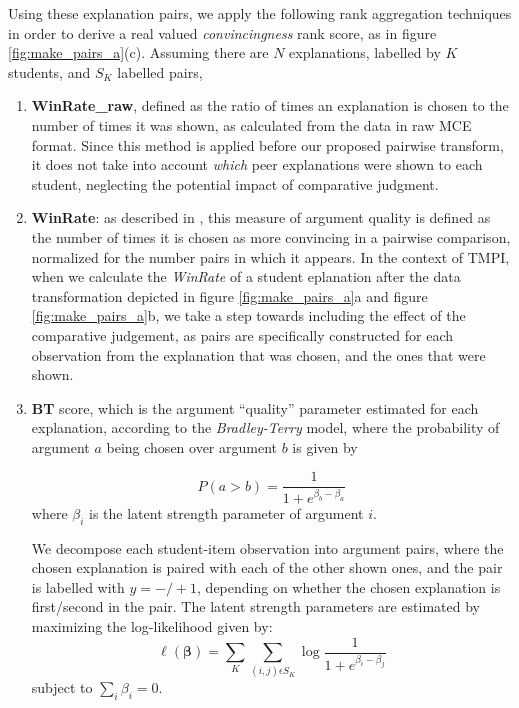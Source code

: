 \documentclass[notitlepage,12pt]{jedm}
\begin{document}
Using these explanation pairs, we apply the following rank aggregation 
techniques in order to derive a real valued \textit{convincingness} rank score, 
as in figure \ref{fig:make_pairs_a}(c).
Assuming there are $N$ explanations, labelled by $K$ students, and $S_K$ 
labelled pairs,

\begin{enumerate}
	
	\item \textbf{WinRate\_raw}, defined as the ratio of times an explanation 
	is chosen to the number of times it was shown, as calculated from the data 
	in raw MCE format.
	Since this method is applied before our proposed pairwise transform, it 
	does not take into account \textit{which} peer explanations were shown to 
	each student, neglecting the potential impact of comparative judgment.
	
	\item \textbf{WinRate}: as described in \cite{potash_ranking_2019}, this 
	measure of argument quality is defined as the number of times it is chosen 
	as more convincing in a pairwise comparison, normalized for the number 
	pairs in which it appears. 
	In the context of TMPI, when we calculate the \textit{WinRate} of a student 
	eplanation after the data transformation depicted in figure 
	\ref{fig:make_pairs_a}a and figure \ref{fig:make_pairs_a}b, we take a step 
	towards including the effect of the comparative judgement, as pairs are 
	specifically constructed for each observation from the explanation that was 
	chosen, and the ones that were shown.
	
	\item \textbf{BT} score, which is the argument ``quality'' parameter 
	estimated for each explanation, according to the \textit{Bradley-Terry} 
	model, where the probability of argument $a$ being chosen over argument $b$ 
	is given by 
	
	$$
	P(a>b) = 
	\frac{1}{1+e^{\beta_b-\beta_a}}
	$$
	where $\beta_i$ is the latent strength parameter of argument $i$.
	
	We decompose each student-item observation into argument pairs, where the 
	chosen explanation is paired with each of the other shown ones, and the 
	pair is labelled with $y=-/+1$, depending on whether the chosen explanation 
	is first/second in the pair.
	The latent strength parameters are estimated by maximizing 
	the log-likelihood given by:
	$$
	\ell(\boldsymbol{\beta})=\sum_{K}\sum_{(i,j)\epsilon S_K}^{} 
	\log\frac{1}{1+e^{\beta_i - \beta_j}}
	$$
	subject to $\sum_{i}\beta_i=0$.
	

\end{enumerate}
\end{document}
